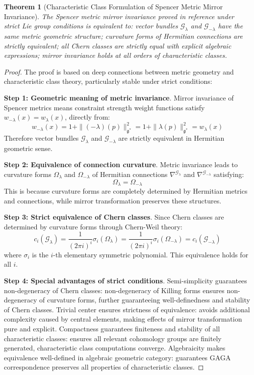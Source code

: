 \documentclass[a4paper,12pt]{extarticle}
\newtheorem{theorem}{Theorem}
\theoremstyle{definition}
\begin{document}
\begin{theorem}[Characteristic Class Formulation of Spencer Metric Mirror Invariance]
The Spencer metric mirror invariance proved in reference\cite{zheng2025mirror} under strict Lie group conditions is equivalent to: vector bundles $\mathcal{G}_{\lambda}$ and $\mathcal{G}_{-\lambda}$ have the same metric geometric structure; curvature forms of Hermitian connections are strictly equivalent; all Chern classes are strictly equal with explicit algebraic expressions; mirror invariance holds at all orders of characteristic classes.
\end{theorem}

\begin{proof}
The proof is based on deep connections between metric geometry and characteristic class theory, particularly stable under strict conditions:

\textbf{Step 1: Geometric meaning of metric invariance}. Mirror invariance of Spencer metrics means constraint strength weight functions satisfy $w_{-\lambda}(x) = w_{\lambda}(x)$, directly from:
$$w_{-\lambda}(x) = 1 + \|(-\lambda)(p)\|^2_{\mathfrak{g}^*} = 1 + \|\lambda(p)\|^2_{\mathfrak{g}^*} = w_{\lambda}(x)$$
Therefore vector bundles $\mathcal{G}_{\lambda}$ and $\mathcal{G}_{-\lambda}$ are strictly equivalent in Hermitian geometric sense.

\textbf{Step 2: Equivalence of connection curvature}. Metric invariance leads to curvature forms $\Omega_{\lambda}$ and $\Omega_{-\lambda}$ of Hermitian connections $\nabla^{\mathcal{G}_{\lambda}}$ and $\nabla^{\mathcal{G}_{-\lambda}}$ satisfying:
$$\Omega_{\lambda} = \Omega_{-\lambda}$$
This is because curvature forms are completely determined by Hermitian metrics and connections, while mirror transformation preserves these structures.

\textbf{Step 3: Strict equivalence of Chern classes}. Since Chern classes are determined by curvature forms through Chern-Weil theory:
$$c_i(\mathcal{G}_{\lambda}) = \frac{1}{(2\pi i)^i} \sigma_i(\Omega_{\lambda}) = \frac{1}{(2\pi i)^i} \sigma_i(\Omega_{-\lambda}) = c_i(\mathcal{G}_{-\lambda})$$
where $\sigma_i$ is the $i$-th elementary symmetric polynomial. This equivalence holds for all $i$.

\textbf{Step 4: Special advantages of strict conditions}. Semi-simplicity guarantees non-degeneracy of Chern classes: non-degeneracy of Killing forms ensures non-degeneracy of curvature forms, further guaranteeing well-definedness and stability of Chern classes. Trivial center ensures strictness of equivalence: avoids additional complexity caused by central elements, making effects of mirror transformation pure and explicit. Compactness guarantees finiteness and stability of all characteristic classes: ensures all relevant cohomology groups are finitely generated, characteristic class computations converge. Algebraicity makes equivalence well-defined in algebraic geometric category: guarantees GAGA correspondence preserves all properties of characteristic classes.


\end{proof}
\end{document}
